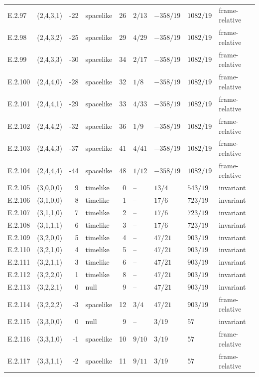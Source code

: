 {\begin{longtable}{@{}llrlrllll@{}}
E.2.97 & (2,4,3,1) & -22 & spacelike & 26 & $2/13$ & $-358/19$ & $1082/19$ & frame-relative \\
E.2.98 & (2,4,3,2) & -25 & spacelike & 29 & $4/29$ & $-358/19$ & $1082/19$ & frame-relative \\
E.2.99 & (2,4,3,3) & -30 & spacelike & 34 & $2/17$ & $-358/19$ & $1082/19$ & frame-relative \\
E.2.100 & (2,4,4,0) & -28 & spacelike & 32 & $1/8$ & $-358/19$ & $1082/19$ & frame-relative \\
E.2.101 & (2,4,4,1) & -29 & spacelike & 33 & $4/33$ & $-358/19$ & $1082/19$ & frame-relative \\
E.2.102 & (2,4,4,2) & -32 & spacelike & 36 & $1/9$ & $-358/19$ & $1082/19$ & frame-relative \\
E.2.103 & (2,4,4,3) & -37 & spacelike & 41 & $4/41$ & $-358/19$ & $1082/19$ & frame-relative \\
E.2.104 & (2,4,4,4) & -44 & spacelike & 48 & $1/12$ & $-358/19$ & $1082/19$ & frame-relative \\
E.2.105 & (3,0,0,0) & 9 & timelike & 0 & -- & $13/4$ & $543/19$ & invariant \\
E.2.106 & (3,1,0,0) & 8 & timelike & 1 & -- & $17/6$ & $723/19$ & invariant \\
E.2.107 & (3,1,1,0) & 7 & timelike & 2 & -- & $17/6$ & $723/19$ & invariant \\
E.2.108 & (3,1,1,1) & 6 & timelike & 3 & -- & $17/6$ & $723/19$ & invariant \\
E.2.109 & (3,2,0,0) & 5 & timelike & 4 & -- & $47/21$ & $903/19$ & invariant \\
E.2.110 & (3,2,1,0) & 4 & timelike & 5 & -- & $47/21$ & $903/19$ & invariant \\
E.2.111 & (3,2,1,1) & 3 & timelike & 6 & -- & $47/21$ & $903/19$ & invariant \\
E.2.112 & (3,2,2,0) & 1 & timelike & 8 & -- & $47/21$ & $903/19$ & invariant \\
E.2.113 & (3,2,2,1) & 0 & null & 9 & -- & $47/21$ & $903/19$ & invariant \\
E.2.114 & (3,2,2,2) & -3 & spacelike & 12 & $3/4$ & $47/21$ & $903/19$ & frame-relative \\
E.2.115 & (3,3,0,0) & 0 & null & 9 & -- & $3/19$ & $57$ & invariant \\
E.2.116 & (3,3,1,0) & -1 & spacelike & 10 & $9/10$ & $3/19$ & $57$ & frame-relative \\
E.2.117 & (3,3,1,1) & -2 & spacelike & 11 & $9/11$ & $3/19$ & $57$ & frame-relative \\

\end{longtable}}
